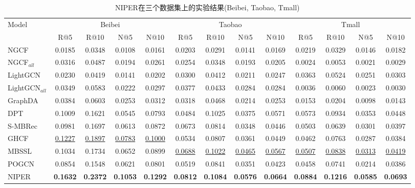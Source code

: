 \begin{table}[htbp]
\renewcommand{\arraystretch}{1.0}
\caption{NIPER在三个数据集上的实验结果(Beibei, Taobao, Tmall)}
\centering
\begin{adjustbox}{width=1\textwidth}
\begin{tabular}{l|cccc|cccc|cccc}
\toprule
\multirow{2}{*}{Model} & \multicolumn{4}{c|}{Beibei} & \multicolumn{4}{c|}{Taobao} & \multicolumn{4}{c}{Tmall} \\
& R@5 & R@10 & N@5 & N@10 & R@5 & R@10 & N@5 & N@10 & R@5 & R@10 & N@5 & N@10\\
\midrule
NGCF \cite{wang2019NGCF} & 0.0185 & 0.0348 & 0.0108 & 0.0161 & 0.0203 & 0.0291 & 0.0141 & 0.0169 & 0.0219 & 0.0329 & 0.0146 & 0.0182  \\
NGCF${_{all}}$ \cite{wang2019NGCF}& 0.0316 & 0.0487 & 0.0194 & 0.0261 & 0.0254 & 0.0348 & 0.0193 & 0.0205 & 0.0024 & 0.0053 & 0.0021 & 0.0029\\
LightGCN \cite{he2020lightgcn} & 0.0230& 0.0419 & 0.0141 & 0.0202 & 0.0300 & 0.0412 & 0.0211 & 0.0247 & 0.0363 & 0.0524 & 0.0251 & 0.0303 \\
LightGCN${_{all}}$ \cite{he2020lightgcn}& 0.0349 & 0.0583 & 0.0222 & 0.0297 & 0.0377 & 0.0433 & 0.0284 & 0.0284 & 0.0036 & 0.0060 & 0.0023 & 0.0030\\
GraphDA \cite{fan2023graphDA}& 0.0384 & 0.0603 & 0.0253 & 0.0312 & 0.0318 & 0.0468 & 0.0214 & 0.0253 & 0.0153 & 0.0204 & 0.0098 & 0.0143\\
DPT \cite{zhang2023DPT}& 0.1009 & 0.1621 & 0.0545 & 0.0793 & 0.0484 & 0.1025  & 0.0375 & 0.0571 & 0.0573 & 0.0934 & 0.0353 & 0.0448\\
S-MBRec \cite{gu2022S-MBRec}& 0.0981 & 0.1697 & 0.0613 & 0.0872 & 0.0673 & 0.0814 & 0.0348 & 0.0446 & 0.0503	& 0.0639 & 0.0301 &	0.0397\\
GHCF \cite{chen2021GHCF}& \uline{0.1227} & \uline{0.1897} & \uline{0.0783} & \uline{0.1000} & 0.0534 & 0.0807 & 0.0361 & 0.0449 & 0.0462 & 0.0763 & 0.0287 & 0.0384\\
MBSSL \cite{xu2023MBSSL}& 0.1034 & 0.1734 & 0.0652 & 0.0899 & \uline{0.0688} & \uline{0.1022} & \uline{0.0465} & \uline{0.0567} & \uline{0.0507} & \uline{0.0838} & \uline{0.0313} & \uline{0.0419} \\
POGCN \cite{zhang2024POGCN}& 0.0854 & 0.1548 & 0.0621 & 0.0801 & 0.0519 & 0.0841 & 0.0351 & 0.0423 & 0.0458 & 0.0741 & 0.0214 & 0.0386   \\
NIPER & \textbf{0.1632} & \textbf{0.2372} & \textbf{0.1053} & \textbf{0.1292} & \textbf{0.0812} & \textbf{0.1084} & \textbf{0.0576} & \textbf{0.0664} & \textbf{0.0884} & \textbf{0.1216} & \textbf{0.0585} & \textbf{0.0693} \\ 
\bottomrule
\end{tabular}
\end{adjustbox}
\label{table:Comparison} 
\end{table}

